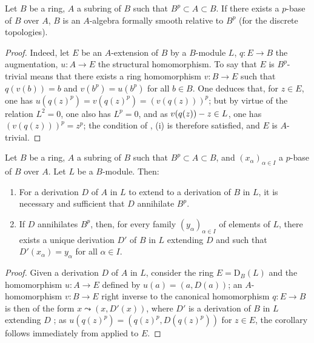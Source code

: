 \begin{corollary}[21.2.2]
\label{0.21.2.2}
Let $B$ be a ring, $A$ a subring of $B$ such that $B^p\subset A\subset B$.
If there exists a $p$-base of $B$ over $A$, $B$ is an $A$-algebra formally smooth relative to $B^p$ \textup{(}for the discrete topologies\textup{)}.
\end{corollary}

\begin{proof}
Indeed, let $E$ be an $A$-extension of $B$ by a $B$-module $L$, $q:E\to B$ the augmentation, $u:A\to E$ the structural homomorphism.
To say that $E$ is $B^p$-trivial means that there exists a ring homomorphism $v:B\to E$ such that $q(v(b))=b$ and $v(b^p)=u(b^p)$ for all $b\in B$.
One deduces that, for $z\in E$, one has $u(q(z)^p)=v(q(z)^p)=(v(q(z)))^p$; but by virtue of the relation $L^2=0$, one also has $L^p=0$, and as $v(q(z))- z\in L$, one has $(v(q(z)))^p=z^p$; the condition of , (i) is therefore satisfied, and $E$ is $A$-trivial.
\end{proof}

\begin{corollary}[21.2.3]
\label{0.21.2.3}
Let $B$ be a ring, $A$ a subring of $B$ such that $B^p\subset A\subset B$, and $(x_\alpha)_{\alpha\in I}$ a $p$-base of $B$ over $A$.
Let $L$ be a $B$-module.
Then:
\begin{enumerate}
  \item[\rm(i)] For a derivation $D$ of $A$ in $L$ to extend to a derivation of $B$ in $L$, it is necessary and sufficient that $D$ annihilate $B^p$.
  \item[\rm(ii)] If $D$ annihilates $B^p$, then, for every family $(y_\alpha)_{\alpha\in I}$ of elements of $L$, there exists a unique derivation $D'$ of $B$ in $L$ extending $D$ and such that $D'(x_\alpha)=y_\alpha$ for all $\alpha\in I$.
\end{enumerate}
\end{corollary}

\begin{proof}
Given a derivation $D$ of $A$ in $L$, consider the ring $E=\mathrm{D}_B(L)$ and the homomorphism $u:A\to E$ defined by $u(a)=(a,D(a))$; an $A$-homomorphism $v:B\to E$ right inverse to the canonical homomorphism $q:E\to B$ is then of the form $x\leadsto(x,D'(x))$, where $D'$ is a derivation of $B$ in $L$ extending $D$ ; as $u(q(z)^p)=(q(z)^p,D(q(z)^p))$ for $z\in E$, the corollary follows immediately from  applied to $E$.
\end{proof}


